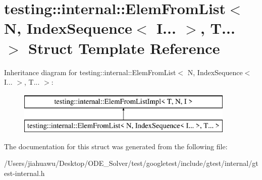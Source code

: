 \hypertarget{structtesting_1_1internal_1_1_elem_from_list_3_01_n_00_01_index_sequence_3_01_i_8_8_8_01_4_00_01_t_8_8_8_01_4}{}\section{testing\+:\+:internal\+:\+:Elem\+From\+List$<$ N, Index\+Sequence$<$ I... $>$, T... $>$ Struct Template Reference}
\label{structtesting_1_1internal_1_1_elem_from_list_3_01_n_00_01_index_sequence_3_01_i_8_8_8_01_4_00_01_t_8_8_8_01_4}
Inheritance diagram for testing\+:\+:internal\+:\+:Elem\+From\+List$<$ N, Index\+Sequence$<$ I... $>$, T... $>$\+:\begin{figure}[H]
\begin{center}
\leavevmode
\includegraphics[height=2.000000cm]{structtesting_1_1internal_1_1_elem_from_list_3_01_n_00_01_index_sequence_3_01_i_8_8_8_01_4_00_01_t_8_8_8_01_4}
\end{center}
\end{figure}


The documentation for this struct was generated from the following file\+:\begin{DoxyCompactItemize}
\item 
/\+Users/jiahuawu/\+Desktop/\+O\+D\+E\+\_\+\+Solver/test/googletest/include/gtest/internal/gtest-\/internal.\+h\end{DoxyCompactItemize}
